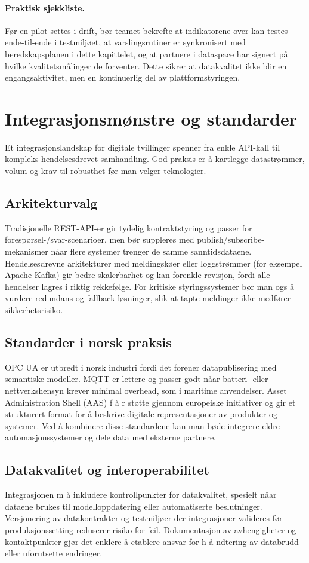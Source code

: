\paragraph{Praktisk sjekkliste.} Før en pilot settes i drift, bør teamet bekrefte at indikatorene over kan testes ende-til-ende i testmiljøet, at varslingsrutiner er synkronisert med beredskapsplanen i dette kapittelet, og at partnere i dataspace har signert på hvilke kvalitetsmålinger de forventer. Dette sikrer at datakvalitet ikke blir en engangsaktivitet, men en kontinuerlig del av plattformstyringen.

\section{Integrasjonsmønstre og standarder}
Et integrasjonslandskap for digitale tvillinger spenner fra enkle API-kall til kompleks hendelsesdrevet samhandling. God praksis er  å kartlegge datastrømmer, volum og krav til robusthet før man velger teknologier.

\subsection{Arkitekturvalg}
Tradisjonelle REST-API-er gir tydelig kontraktstyring og passer for forespørsel-/svar-scenarioer, men bør suppleres med publish/subscribe-mekanismer nåar flere systemer trenger de samme sanntidsdataene. Hendelsesdrevne arkitekturer med meldingskøer eller loggstrømmer (for eksempel Apache Kafka) gir bedre skalerbarhet og kan forenkle revisjon, fordi alle hendelser lagres i riktig rekkefølge. For kritiske styringssystemer bør man ogs å vurdere redundans og fallback-løsninger, slik at tapte meldinger ikke medfører sikkerhetsrisiko.

\subsection{Standarder i norsk praksis}
OPC UA er utbredt i norsk industri fordi det forener datapublisering med semantiske modeller. MQTT er lettere og passer godt nåar batteri- eller nettverkshensyn krever minimal overhead, som i maritime anvendelser. Asset Administration Shell (AAS) f å r støtte gjennom europeiske initiativer og gir et strukturert format for  å beskrive digitale representasjoner av produkter og systemer. Ved  å kombinere disse standardene kan man bøde integrere eldre automasjonssystemer og dele data med eksterne partnere.

\subsection{Datakvalitet og interoperabilitet}
Integrasjonen m å inkludere kontrollpunkter for datakvalitet, spesielt nåar dataene brukes til modelloppdatering eller automatiserte beslutninger. Versjonering av datakontrakter og testmiljøer der integrasjoner valideres før produksjonssetting reduserer risiko for feil. Dokumentasjon av avhengigheter og kontaktpunkter gjør det enklere  å etablere ansvar for h å ndtering av databrudd eller uforutsette endringer.

